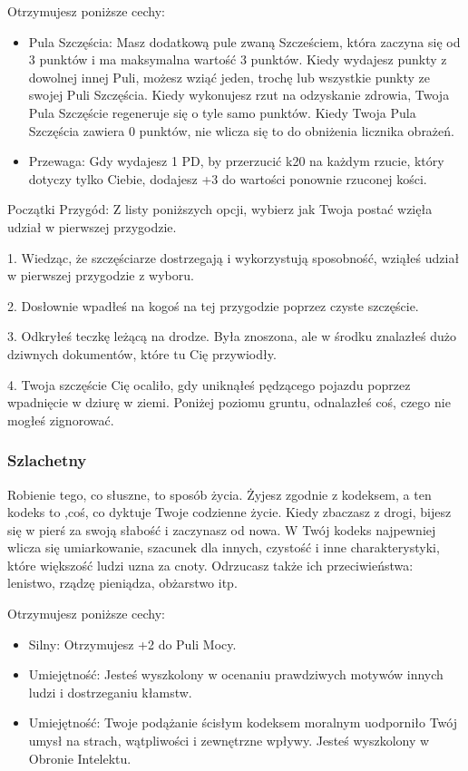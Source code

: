 Otrzymujesz poniższe cechy:
\begin{itemize}
    \item  Pula Szczęścia: Masz dodatkową pule zwaną Szcześciem, która zaczyna się od 3 punktów i ma maksymalna wartość 3 punktów. Kiedy wydajesz punkty z dowolnej innej Puli, możesz wziąć jeden, trochę lub wszystkie punkty ze swojej Puli Szczęścia. Kiedy wykonujesz rzut na odzyskanie zdrowia, Twoja Pula Szczęście regeneruje się o tyle samo punktów. Kiedy Twoja Pula Szczęścia zawiera 0 punktów, nie wlicza się to do obniżenia licznika obrażeń. 
    \item  Przewaga: Gdy wydajesz 1 PD, by przerzucić k20 na każdym rzucie, który dotyczy tylko Ciebie, dodajesz +3 do wartości ponownie rzuconej kości. 
\end{itemize}

Początki Przygód: Z listy poniższych opcji, wybierz jak Twoja postać wzięła udział w pierwszej przygodzie.

1. Wiedząc, że szczęściarze dostrzegają i wykorzystują sposobność, wziąłeś udział w pierwszej przygodzie z wyboru. 

2. Dosłownie wpadłeś na kogoś na tej przygodzie poprzez czyste szczęście.

3. Odkryłeś teczkę leżącą na drodze. Była znoszona, ale w  środku znalazłeś dużo dziwnych dokumentów, które tu Cię 
przywiodły.

4. Twoja szczęście Cię ocaliło, gdy uniknąłeś pędzącego pojazdu poprzez wpadnięcie w dziurę w ziemi. Poniżej poziomu gruntu, odnalazłeś coś, czego nie mogłeś zignorować. 

\subsubsection{Szlachetny}
Robienie tego, co słuszne, to sposób życia. Żyjesz zgodnie z kodeksem, a ten kodeks to ,coś, co dyktuje Twoje codzienne życie. Kiedy zbaczasz z drogi, bijesz się w pierś za swoją słabość i zaczynasz od nowa. W Twój kodeks najpewniej wlicza się umiarkowanie, szacunek dla innych, czystość i inne charakterystyki, które większość ludzi uzna za cnoty. Odrzucasz także ich przeciwieństwa: lenistwo, rządzę pieniądza, obżarstwo itp.

Otrzymujesz poniższe cechy:
\begin{itemize}
    \item  Silny: Otrzymujesz +2 do Puli Mocy.
    \item  Umiejętność: Jesteś wyszkolony w ocenaniu prawdziwych motywów innych ludzi i dostrzeganiu kłamstw.
    \item  Umiejętność: Twoje podążanie ścisłym kodeksem moralnym uodporniło Twój umysł na strach, wątpliwości i zewnętrzne wpływy. Jesteś wyszkolony w Obronie Intelektu.
\end{itemize}

